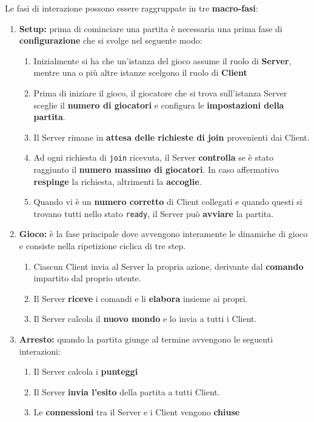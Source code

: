 Le fasi di interazione possono essere raggruppate in tre \textbf{macro-fasi}:
\begin{enumerate}
    \item \textbf{Setup:} prima di cominciare una partita è necessaria una prima fase di \textbf{configurazione} che si svolge nel seguente modo:
        \begin{enumerate}
            \item Inizialmente si ha che un'istanza del gioco assume il ruolo di \textbf{Server}, mentre una o più altre istanze scelgono il ruolo di \textbf{Client}
            \item Prima di iniziare il gioco, il giocatore che si trova sull'istanza Server sceglie il \textbf{numero di giocatori} e configura le \textbf{impostazioni della partita}.
            \item Il Server rimane in \textbf{attesa delle richieste di join} provenienti dai Client.
            \item Ad ogni richiesta di \texttt{join} ricevuta, il Server \textbf{controlla} se è stato raggiunto il \textbf{numero massimo di giocatori}. In caso affermativo \textbf{respinge} la richiesta, altrimenti la \textbf{accoglie}.
            \item Quando vi è un \textbf{numero corretto} di Client collegati e quando questi si trovano tutti nello stato \texttt{ready}, il Server può \textbf{avviare} la partita.
        \end{enumerate}
    \item \textbf{Gioco:} è la fase principale dove avvengono interamente le dinamiche di gioco e consiste nella ripetizione ciclica di tre step.
        \begin{enumerate}
            \item Ciascun Client invia al Server la propria azione, derivante dal \textbf{comando} impartito dal proprio utente.
            \item Il Server \textbf{riceve} i comandi e li \textbf{elabora} insieme ai propri.
            \item Il Server calcola il \textbf{nuovo mondo} e lo invia a tutti i Client.
        \end{enumerate}
    \item \textbf{Arresto:} quando la partita giunge al termine avvengono le seguenti interazioni:
        \begin{enumerate}
            \item Il Server calcola i \textbf{punteggi}
            \item Il Server \textbf{invia l'esito} della partita a tutti Client.
            \item Le \textbf{connessioni} tra il Server e i Client vengono \textbf{chiuse}
        \end{enumerate}
\end{enumerate}

